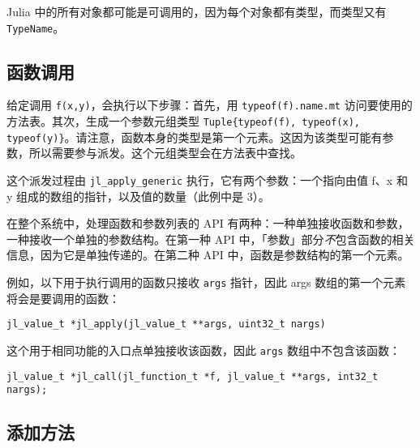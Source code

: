 Julia 中的所有对象都可能是可调用的，因为每个对象都有类型，而类型又有 \texttt{TypeName}。



\hypertarget{13252419531822255004}{}


\subsection{函数调用}



给定调用 \texttt{f(x,y)}，会执行以下步骤：首先，用 \texttt{typeof(f).name.mt} 访问要使用的方法表。其次，生成一个参数元组类型 \texttt{Tuple\{typeof(f), typeof(x), typeof(y)\}}。请注意，函数本身的类型是第一个元素。这因为该类型可能有参数，所以需要参与派发。这个元组类型会在方法表中查找。



这个派发过程由 \texttt{jl\_apply\_generic} 执行，它有两个参数：一个指向由值 f、x 和 y 组成的数组的指针，以及值的数量（此例中是 3）。



在整个系统中，处理函数和参数列表的 API 有两种：一种单独接收函数和参数，一种接收一个单独的参数结构。在第一种 API 中，「参数」部分\emph{不}包含函数的相关信息，因为它是单独传递的。在第二种 API 中，函数是参数结构的第一个元素。



例如，以下用于执行调用的函数只接收 \texttt{args} 指针，因此 args 数组的第一个元素将会是要调用的函数：




\begin{lstlisting}
jl_value_t *jl_apply(jl_value_t **args, uint32_t nargs)
\end{lstlisting}



这个用于相同功能的入口点单独接收该函数，因此 \texttt{args} 数组中不包含该函数：




\begin{lstlisting}
jl_value_t *jl_call(jl_function_t *f, jl_value_t **args, int32_t nargs);
\end{lstlisting}



\hypertarget{12335264465348807608}{}


\subsection{添加方法}



